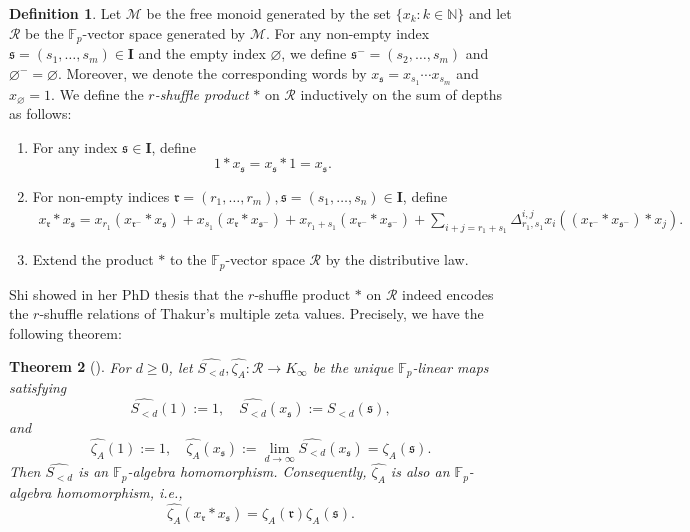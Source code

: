 \documentclass[12pt,reqno]{amsart}
\numberwithin{equation}{section}
\theoremstyle{plain}
\newtheorem{thm}{Theorem}[section]
\theoremstyle{definition}
\newtheorem{df}[thm]{Definition}
\theoremstyle{remark}
\newcommand{\NN}{\mathbb{N}}
\newcommand{\FF}{\mathbb{F}}
\newcommand{\Mcal}{\mathcal{M}}
\newcommand{\Rcal}{\mathcal{R}}
\newcommand{\ww}[1]{\mathfrak{#1}}
\newcommand{\Ical}{\mathbf{I}}
\begin{document}
\begin{df}\label{df-zeta-values-as-words}
    Let $\Mcal$ be the free monoid generated by the set $\{x_k : k \in \NN\}$ and let $\Rcal$ be the $\FF_p$-vector space generated by $\Mcal$. For any non-empty index $\ww{s}=(s_1,\ldots,s_m)\in\Ical$ and the empty index $\varnothing$, we define
    $\ww{s}^-=(s_2,\ldots,s_m)$ and $\varnothing^-=\varnothing$. Moreover, we denote the corresponding words by
    $x_{\ww{s}}=x_{s_1}\cdots x_{s_m}$ and $x_\varnothing=1.$
    We define the \textit{$r$-shuffle product} $\ast$ on $\Rcal$ inductively on the sum of depths as follows:
    \begin{enumerate}
        \item For any index $\ww{s}\in\Ical$, define
        \[
        1\ast x_{\ww{s}}=x_{\ww{s}}\ast 1=x_\ww{s}.
        \]
        \item For non-empty indices $\ww{r}=(r_1,\ldots,r_m),\ww{s}=(s_1,\ldots,s_n)\in\Ical$, define
        \begin{align}\label{eq:inductive-r-shuffle}
             x_{\ww{r}} \ast x_{\ww{s}}
            = x_{r_1} ( x_{\ww{r}^-} \ast x_{\ww{s}} ) 
            + x_{s_1} ( x_{\ww{r}} \ast x_{\ww{s}^-} ) 
            + x_{r_1 + s_1} ( x_{\ww{r}^-} \ast x_{\ww{s}^-} )+ \sum_{i+j = r_1+s_1} 
            \Delta^{i,j}_{r_1,s_1} x_i ( ( x_{\ww{r}^-} \ast x_{\ww{s}^-} ) \ast x_j ).
        \end{align}
        \item Extend the product $\ast$ to the $\FF_p$-vector space $\Rcal$ by the distributive law.
    \end{enumerate}
\end{df}

Shi showed in her PhD thesis \cite{Shi2018} that the $r$-shuffle product $\ast$ on $\Rcal$ indeed encodes the $r$-shuffle relations of Thakur's multiple zeta values. Precisely, we have the following theorem:

\begin{thm}[{\cite[Theorem 3.1.4]{Shi2018}}]\label{thm:Shi-r-shuffle}
    For $d\geq 0$, let $\widehat{S_{<d}}, \widehat{\zeta_A}:\Rcal \to K_\infty$ be the unique $\FF_p$-linear maps satisfying
    \[
    \widehat{S_{<d}}(1) := 1,
    \quad
    \widehat{S_{<d}}(x_{\ww{s}})
    := S_{<d}(\ww{s}),
    \]
    and
    \[
    \widehat{\zeta_A}(1):=1,
    \quad
    \widehat{\zeta_A} (x_{\ww{s}})
    := \lim_{d\to \infty} \widehat{S_{<d}}(x_{\ww{s}})
    = \zeta_A(\ww{s}).
    \]
    Then $\widehat{S_{<d}}$ is an $\FF_p$-algebra homomorphism.
    Consequently, $\widehat{\zeta_A}$ is also an $\FF_p$-algebra homomorphism, i.e., 
    \[
    \widehat{\zeta_A}(x_{\ww{r}} \ast x_{\ww{s}})=\zeta_A(\ww{r})\zeta_A(\ww{s}).
    \]
\end{thm}
\end{document}
